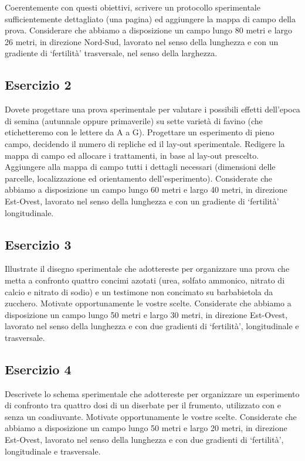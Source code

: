 \documentclass[
  12pt,
]{book}
\begin{document}
Coerentemente con questi obiettivi, scrivere un protocollo sperimentale sufficientemente dettagliato (una pagina) ed aggiungere la mappa di campo della prova. Considerare che abbiamo a disposizione un campo lungo 80 metri e largo 26 metri, in direzione Nord-Sud, lavorato nel senso della lunghezza e con un gradiente di `fertilità' trasversale, nel senso della larghezza.

\hypertarget{esercizio-2}{%
\subsection{Esercizio 2}\label{esercizio-2}}

Dovete progettare una prova sperimentale per valutare i possibili effetti dell'epoca di semina (autunnale oppure primaverile) su sette varietà di favino (che etichetteremo con le lettere da A a G). Progettare un esperimento di pieno campo, decidendo il numero di repliche ed il lay-out sperimentale. Redigere la mappa di campo ed allocare i trattamenti, in base al lay-out prescelto. Aggiungere alla mappa di campo tutti i dettagli necessari (dimensioni delle parcelle, localizzazione ed orientamento dell'esperimento). Considerate che abbiamo a disposizione un campo lungo 60 metri e largo 40 metri, in direzione Est-Ovest, lavorato nel senso della lunghezza e con un gradiente di `fertilità' longitudinale.

\hypertarget{esercizio-3}{%
\subsection{Esercizio 3}\label{esercizio-3}}

Illustrate il disegno sperimentale che adottereste per organizzare una prova che metta a confronto quattro concimi azotati (urea, solfato ammonico, nitrato di calcio e nitrato di sodio) e un testimone non concimato su barbabietola da zucchero. Motivate opportunamente le vostre scelte. Considerate che abbiamo a disposizione un campo lungo 50 metri e largo 30 metri, in direzione Est-Ovest, lavorato nel senso della lunghezza e con due gradienti di `fertilità', longitudinale e trasversale.

\hypertarget{esercizio-4}{%
\subsection{Esercizio 4}\label{esercizio-4}}

Descrivete lo schema sperimentale che adottereste per organizzare un esperimento di confronto tra quattro dosi di un diserbate per il frumento, utilizzato con e senza un coadiuvante. Motivate opportunamente le vostre scelte. Considerate che abbiamo a disposizione un campo lungo 50 metri e largo 20 metri, in direzione Est-Ovest, lavorato nel senso della lunghezza e con due gradienti di `fertilità', longitudinale e trasversale.
\end{document}
